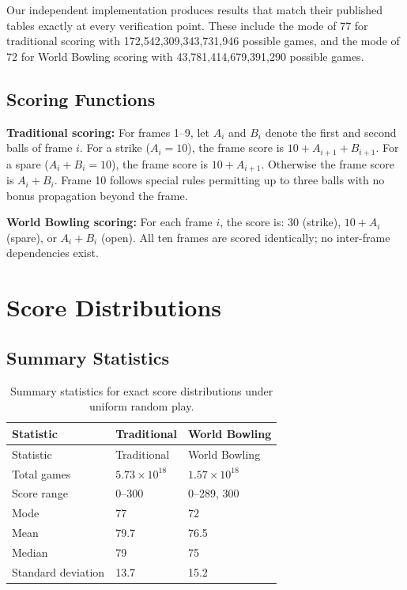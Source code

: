 \documentclass[
  letterpaper,
  DIV=11,
  numbers=noendperiod]{scrartcl}
\begin{document}
Our independent implementation produces results that match their
published tables exactly at every verification point. These include the
mode of 77 for traditional scoring with 172,542,309,343,731,946 possible
games, and the mode of 72 for World Bowling scoring with
43,781,414,679,391,290 possible games.

\subsection{Scoring Functions}\label{scoring-functions}

\textbf{Traditional scoring:} For frames 1--9, let \(A_i\) and \(B_i\)
denote the first and second balls of frame \(i\). For a strike
(\(A_i = 10\)), the frame score is \(10 + A_{i+1} + B_{i+1}\). For a
spare (\(A_i + B_i = 10\)), the frame score is \(10 + A_{i+1}\).
Otherwise the frame score is \(A_i + B_i\). Frame 10 follows special
rules permitting up to three balls with no bonus propagation beyond the
frame.

\textbf{World Bowling scoring:} For each frame \(i\), the score is: 30
(strike), \(10 + A_i\) (spare), or \(A_i + B_i\) (open). All ten frames
are scored identically; no inter-frame dependencies exist.

\section{Score Distributions}\label{score-distributions}

\subsection{Summary Statistics}\label{summary-statistics}

\begin{longtable}[]{@{}lll@{}}
\caption{Summary statistics for exact score distributions under uniform
random play.}\label{tbl-summary}\tabularnewline
\toprule\noalign{}
Statistic & Traditional & World Bowling \\
\midrule\noalign{}
\endfirsthead
\toprule\noalign{}
Statistic & Traditional & World Bowling \\
\midrule\noalign{}
\endhead
\bottomrule\noalign{}
\endlastfoot
Total games & \(5.73 \times 10^{18}\) & \(1.57 \times 10^{18}\) \\
Score range & 0--300 & 0--289, 300 \\
Mode & 77 & 72 \\
Mean & 79.7 & 76.5 \\
Median & 79 & 75 \\
Standard deviation & 13.7 & 15.2 \\
\end{longtable}
\end{document}
